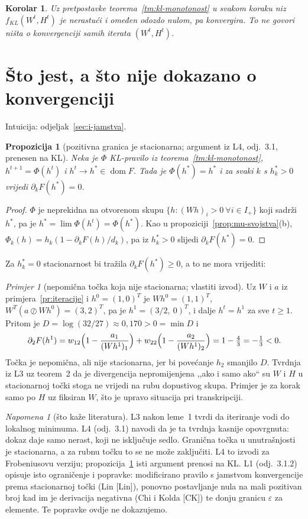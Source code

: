 \documentclass[11pt,a4paper]{article}
\theoremstyle{definition}
\theoremstyle{plain}
\newtheorem{propozicija}[definicija]{Propozicija}
\newtheorem{korolar}[definicija]{Korolar}
\theoremstyle{remark}
\newtheorem{napomena}[definicija]{Napomena}
\newtheorem{primjer}[definicija]{Primjer}
\DeclareMathOperator{\dom}{dom}
\newcommand{\intuicija}[1]{{\small\color{muted}\sffamily Intuicija: odjeljak~\ref{#1}.}\par}
\begin{document}
\begin{korolar}
Uz pretpostavke teorema~\ref{tm:kl-monotonost} u svakom koraku niz $f_{KL}(W^t,H^t)$ je nerastući i
omeđen odozdo nulom, pa konvergira. To ne govori ništa o konvergenciji samih iterata $(W^t,H^t)$.
\end{korolar}

\section{Što jest, a što nije dokazano o konvergenciji}\label{sec:f-konvergencija}
\intuicija{sec:i-jamstva}

\begin{propozicija}[pozitivna granica je stacionarna; argument iz L4, odj.~3.1, prenesen na KL]\label{prop:pozitivna-granica}
Neka je $\Phi$ KL-pravilo iz teorema~\ref{tm:kl-monotonost}, $h^{t+1}=\Phi(h^t)$ i
$h^t\to h^*\in\dom F$. Tada je $\Phi(h^*)=h^*$ i za svaki $k$ s $h^*_k>0$ vrijedi
$\partial_kF(h^*)=0$.
\end{propozicija}
\begin{proof}
$\Phi$ je neprekidna na otvorenom skupu $\{h:(Wh)_i>0\ \forall i\in I_+\}$ koji sadrži $h^*$, pa je
$h^*=\lim\Phi(h^t)=\Phi(h^*)$. Kao u propoziciji~\ref{prop:mu-svojstva}(b),
$\Phi_k(h)=h_k(1-\partial_kF(h)/d_k)$, pa iz $h_k^*>0$ slijedi $\partial_kF(h^*)=0$.
\end{proof}

Za $h^*_k=0$ stacionarnost bi tražila $\partial_kF(h^*)\geq0$, a to ne mora vrijediti:

\begin{primjer}[nepomična točka koja nije stacionarna; vlastiti izvod]\label{pr:zapinjanje}
Uz $W$ i $a$ iz primjera~\ref{pr:iteracije} i $h^0=(1,0)^T$ je $Wh^0=(1,1)^T$,
$W^T(a\oslash Wh^0)=(3,2)^T$, pa je $h^1=(3/2,\ 0)^T$, i dalje $h^t=h^1$ za sve $t\geq1$. Pritom je
$D=\log(32/27)\approx0{,}170>0=\min D$ i
\[
  \partial_2F(h^1)=w_{12}\Bigl(1-\frac{a_1}{(Wh^1)_1}\Bigr)+w_{22}\Bigl(1-\frac{a_2}{(Wh^1)_2}\Bigr)
  =1-\tfrac43=-\tfrac13<0 .
\]
Točka je nepomična, ali nije stacionarna, jer bi povećanje $h_2$ smanjilo $D$. Tvrdnja iz L3 uz
teorem~2 da je divergencija nepromijenjena ,,ako i samo ako`` su $W$ i $H$ u stacionarnoj točki
stoga ne vrijedi na rubu dopustivog skupa. Primjer je za korak samo po $H$ uz fiksiran $W$, što je
upravo situacija pri transkripciji.
\end{primjer}

\begin{napomena}[što kaže literatura]
L3 nakon leme~1 tvrdi da iteriranje vodi do lokalnog minimuma. L4 (odj.~3.1) navodi da je ta
tvrdnja kasnije opovrgnuta: dokaz daje samo nerast, koji ne isključuje sedlo. Granična točka u
unutrašnjosti je stacionarna, a za rubnu točku to se ne može zaključiti. L4 to izvodi za
Frobeniusovu verziju; propozicija~\ref{prop:pozitivna-granica} isti argument prenosi na KL. L1
(odj.~3.1.2) opisuje isto ograničenje i popravke: modificirano pravilo s jamstvom konvergencije
prema stacionarnoj točki (Lin [Lin]), ponovno postavljanje nula na mali pozitivan broj kad im je
derivacija negativna (Chi i Kolda [CK]) te donju granicu $\varepsilon$ za elemente. Te popravke ovdje
ne dokazujemo.
\end{napomena}
\end{document}
